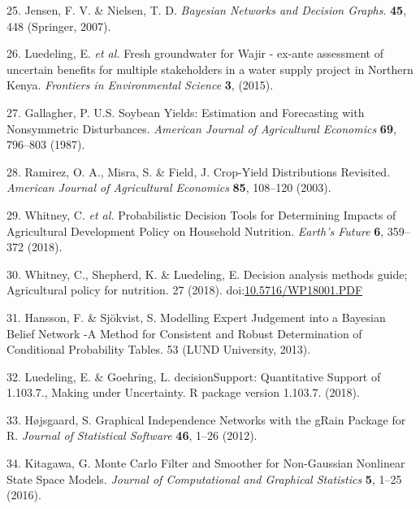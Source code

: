 \documentclass[12pt,oneside]{article}
\begin{document}
\leavevmode\hypertarget{ref-Jensen_and_Nielsen_2007}{}%
25. Jensen, F. V. \& Nielsen, T. D. \emph{Bayesian Networks and Decision Graphs}. \textbf{45}, 448 (Springer, 2007).

\leavevmode\hypertarget{ref-Luedeling_et_al_2015}{}%
26. Luedeling, E. \emph{et al.} Fresh groundwater for Wajir - ex-ante assessment of uncertain benefits for multiple stakeholders in a water supply project in Northern Kenya. \emph{Frontiers in Environmental Science} \textbf{3}, (2015).

\leavevmode\hypertarget{ref-Gallagher_1987}{}%
27. Gallagher, P. U.S. Soybean Yields: Estimation and Forecasting with Nonsymmetric Disturbances. \emph{American Journal of Agricultural Economics} \textbf{69}, 796--803 (1987).

\leavevmode\hypertarget{ref-Ramirez_et_al_2003}{}%
28. Ramirez, O. A., Misra, S. \& Field, J. Crop-Yield Distributions Revisited. \emph{American Journal of Agricultural Economics} \textbf{85}, 108--120 (2003).

\leavevmode\hypertarget{ref-Whitney_et_al_2018}{}%
29. Whitney, C. \emph{et al.} Probabilistic Decision Tools for Determining Impacts of Agricultural Development Policy on Household Nutrition. \emph{Earth's Future} \textbf{6}, 359--372 (2018).

\leavevmode\hypertarget{ref-Whitney_et_al_2018a}{}%
30. Whitney, C., Shepherd, K. \& Luedeling, E. Decision analysis methods guide; Agricultural policy for nutrition. 27 (2018). doi:\href{https://doi.org/10.5716/WP18001.PDF}{10.5716/WP18001.PDF}

\leavevmode\hypertarget{ref-Hansson_and_Sjokvist_2013}{}%
31. Hansson, F. \& Sjökvist, S. Modelling Expert Judgement into a Bayesian Belief Network -A Method for Consistent and Robust Determination of Conditional Probability Tables. 53 (LUND University, 2013).

\leavevmode\hypertarget{ref-Luedeling_and_Goehring_2018}{}%
32. Luedeling, E. \& Goehring, L. decisionSupport: Quantitative Support of 1.103.7., Making under Uncertainty. R package version 1.103.7. (2018).

\leavevmode\hypertarget{ref-Hojsgaard_2012}{}%
33. Højsgaard, S. Graphical Independence Networks with the gRain Package for R. \emph{Journal of Statistical Software} \textbf{46}, 1--26 (2012).

\leavevmode\hypertarget{ref-Kitagawa_2016}{}%
34. Kitagawa, G. Monte Carlo Filter and Smoother for Non-Gaussian Nonlinear State Space Models. \emph{Journal of Computational and Graphical Statistics} \textbf{5}, 1--25 (2016).
\end{document}
